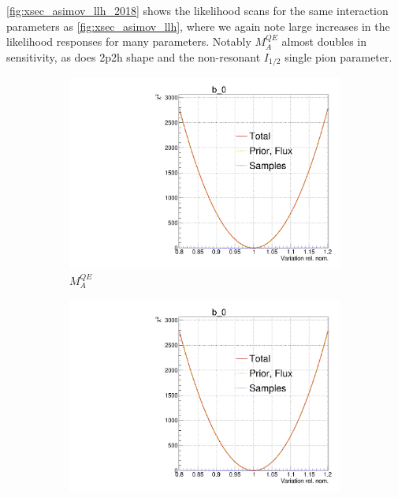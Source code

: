 \autoref{fig:xsec_asimov_llh_2018} shows the likelihood scans for the same interaction parameters as \autoref{fig:xsec_asimov_llh}, where we again note large increases in the likelihood responses for many parameters. Notably $M_A^{QE}$ almost doubles in sensitivity, as does 2p2h shape and the non-resonant $I_{1/2}$ single pion parameter.
\begin{figure}[h]
	\centering
	\begin{subfigure}[t]{0.32\textwidth}
		\includegraphics[width=\textwidth,page=105, trim={0mm 0mm 0mm 9mm}, clip]{figures/mach3/2018/llh/tryBinningNumber6_after_fit_asimov_asimov_ND280logL_scan}
		\caption{$M_A^{QE}$}
	\end{subfigure}
	\begin{subfigure}[t]{0.32\textwidth}
		\includegraphics[width=\textwidth,page=108, trim={0mm 0mm 0mm 9mm}, clip]{figures/mach3/2018/llh/tryBinningNumber6_after_fit_asimov_asimov_ND280logL_scan}

\end{subfigure}
\end{figure}
